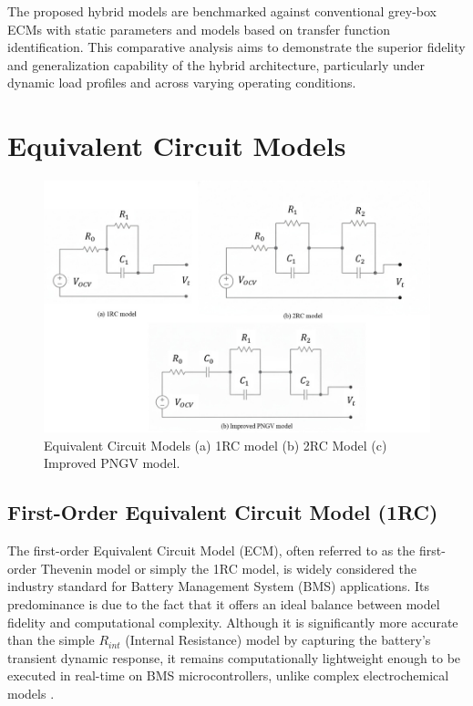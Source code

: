 \documentclass[lettersize,journal]{IEEEtran}
\begin{document}
The proposed hybrid models are benchmarked against conventional grey-box ECMs with static parameters and models based on transfer function identification. This comparative analysis aims to demonstrate the superior fidelity and generalization capability of the hybrid architecture, particularly under dynamic load profiles and across varying operating conditions.

\section{Equivalent Circuit Models}

\begin{figure}
	\centering
	\includegraphics[width=0.7\linewidth]{"ECM models"}
	\caption{Equivalent Circuit Models (a) 1RC model (b) 2RC Model (c) Improved PNGV model.}
	\label{fig:ecm-models}
\end{figure}

\subsection{First-Order Equivalent Circuit Model (1RC)}

The first-order Equivalent Circuit Model (ECM), often referred to as the first-order Thevenin model or simply the 1RC model, is widely considered the industry standard for Battery Management System (BMS) applications\cite{tekin2024comparative}. Its predominance is due to the fact that it offers an ideal balance between model fidelity and computational complexity. Although it is significantly more accurate than the simple $R_{int}$ (Internal Resistance) model by capturing the battery's transient dynamic response, it remains computationally lightweight enough to be executed in real-time on BMS microcontrollers, unlike complex electrochemical models \cite{mawuntu2023modeling}.
\end{document}
